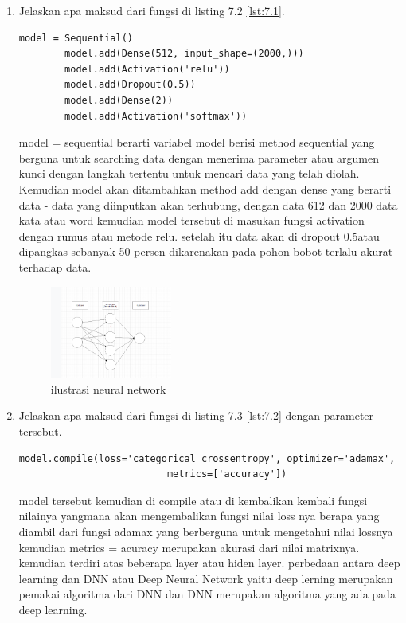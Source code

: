 \begin{enumerate}
    \item Jelaskan apa maksud dari fungsi di listing 7.2 \ref{lst:7.1}. 
    \begin{lstlisting}[caption=Membuat model Neural Network,label={lst:7.1}]
        model = Sequential()
        model.add(Dense(512, input_shape=(2000,)))
        model.add(Activation('relu'))
        model.add(Dropout(0.5))
        model.add(Dense(2))
        model.add(Activation('softmax'))
    \end{lstlisting}
    \hfill\break
    model = sequential berarti variabel model berisi method sequential yang berguna untuk searching data dengan menerima parameter atau argumen kunci dengan langkah tertentu untuk mencari data yang telah diolah. Kemudian model akan ditambahkan method add dengan dense yang berarti data - data yang diinputkan akan terhubung, dengan data 612 dan 2000 data kata atau word kemudian model tersebut di masukan fungsi activation dengan rumus atau metode relu. setelah itu data akan di dropout 0.5atau dipangkas sebanyak 50 persen dikarenakan pada pohon bobot terlalu akurat terhadap data.
    \begin{figure}[H]
	    \centering
	    \includegraphics[width=4cm]{figures/1174096/tugas7/teori_9.PNG}
	    \caption{ilustrasi neural network}
    \end{figure}

    \item Jelaskan apa maksud dari fungsi di listing 7.3 \ref{lst:7.2}  dengan parameter tersebut.
    \begin{lstlisting}[caption=Compile model,label={lst:7.2}]
        model.compile(loss='categorical_crossentropy', optimizer='adamax',
                          metrics=['accuracy'])
    \end{lstlisting}
    model tersebut kemudian di compile atau di kembalikan kembali fungsi nilainya yangmana akan mengembalikan fungsi nilai loss nya berapa yang diambil dari fungsi adamax yang berberguna untuk mengetahui nilai lossnya kemudian metrics = acuracy merupakan akurasi dari nilai matrixnya. kemudian terdiri atas beberapa layer atau hiden layer. perbedaan antara deep learning dan DNN atau Deep Neural Network yaitu deep lerning merupakan pemakai algoritma dari DNN dan DNN merupakan algoritma yang ada pada deep learning.


\end{enumerate}
